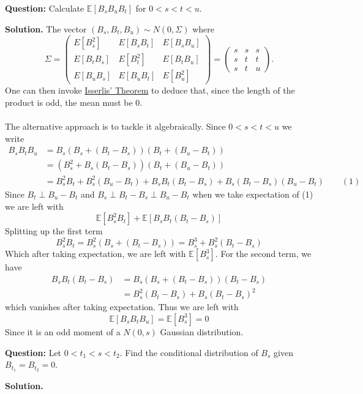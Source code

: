 \documentclass{article}
\begin{document}
\begin{tcolorbox}[colframe=black,colback=gray!5,boxrule=0.5pt]
\textbf{Question:} Calculate $\mathbb{E}[B_sB_uB_t]$ for $0<s<t<u.$
\end{tcolorbox}
\textbf{Solution.} The vector $(B_s, B_t, B_u)\sim N(0,\Sigma)$ where 
\[
\Sigma = \begin{pmatrix}
E[B_s^2] & E[B_s B_t] & E[B_s B_u] \\
E[B_t B_s] & E[B_t^2] & E[B_t B_u] \\
E[B_u B_s] & E[B_u B_t] & E[B_u^2]
\end{pmatrix}
= 
\begin{pmatrix}
s & s & s \\
s & t & t \\
s & t & u
\end{pmatrix}.
\]
One can then invoke \href{https://en.wikipedia.org/wiki/Isserlis%27s_theorem}{Isserlis' Theorem} to deduce that, since the length of the product is odd, the mean must be 0. \\
\\
The alternative approach is to tackle it algebraically. Since $0<s<t<u$ we write
\begin{align*}
    B_sB_tB_u &= B_s(B_s+(B_t-B_s))(B_t+(B_u-B_t)) \\
    &= (B_s^2 + B_s(B_t-B_s))(B_t+(B_u-B_t)) \\
    &= B_s^2B_t + B_s^2(B_u-B_t)+B_sB_t(B_t-B_s) + B_s(B_t-B_s)(B_u-B_t) \quad\quad (1)
\end{align*}
Since $B_t\perp B_u-B_t$ and $B_s \perp B_t-B_s \perp B_u-B_t$ when we take expectation of (1) we are left with
$$\mathbb{E}[B_s^2B_t] + \mathbb{E}[B_s B_t(B_t-B_s)]$$
Splitting up the first term
$$B_s^2B_t = B_s^2 (B_s + (B_t-B_s)) = B_s^3 + B_s^2(B_t-B_s)$$
Which after taking expectation, we are left with $\mathbb{E}[B_s^3].$ For the second term, we have 
\begin{align*}
    B_sB_t(B_t-B_s)&=B_s(B_s+(B_t-B_s))(B_t-B_s) \\
    &=B_s^2(B_t-B_s)+B_s(B_t-B_s)^2
\end{align*}
which vanishes after taking expectation. Thus we are left with 
$$\mathbb{E}[B_sB_tB_u] = \mathbb{E}[B_s^3]=0$$
Since it is an odd moment of a $N(0,s)$ Gaussian distribution.

\begin{tcolorbox}[colframe=black,colback=gray!5,boxrule=0.5pt]
\textbf{Question:} Let $0 < t_1 < s < t_2$. Find the conditional distribution of $B_s$ given $B_{t_1} = B_{t_2} = 0$.
\end{tcolorbox}
\textbf{Solution.}
\end{document}
